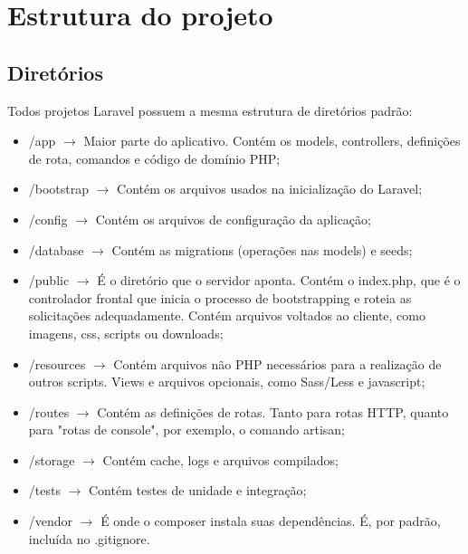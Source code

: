 \documentclass[
12pt,				%
openany,			%
twoside,			%
a4paper,			%
english,			%
french,				%
spanish,			%
brazil,				%
]{abntex2}
\begin{document}
\section{Estrutura do projeto}

\subsection{Diretórios}
Todos projetos Laravel possuem a mesma estrutura de diretórios padrão:

\begin{itemize}
    \item /app $\rightarrow$ Maior parte do aplicativo. Contém os models, controllers, definições de rota, comandos e código de domínio PHP;

    \item /bootstrap $\rightarrow$ Contém os arquivos usados na inicialização do Laravel;

    \item /config $\rightarrow$ Contém os arquivos de configuração da aplicação;

    \item /database $\rightarrow$ Contém as migrations (operações nas models) e seeds;

    \item /public $\rightarrow$ É o diretório que o servidor aponta. Contém o index.php, que é o controlador frontal que inicia o processo de bootstrapping e roteia as solicitações adequadamente. Contém arquivos voltados ao cliente, como imagens, css, scripts ou downloads;
        
    \item /resources $\rightarrow$ Contém arquivos não PHP necessários para a realização de outros scripts. Views e arquivos opcionais, como Sass/Less e javascript;

    \item /routes $\rightarrow$ Contém as definições de rotas. Tanto para rotas HTTP, quanto para "rotas de console", por exemplo, o comando artisan;

    \item /storage $\rightarrow$ Contém cache, logs e arquivos compilados;

    \item /tests $\rightarrow$ Contém testes de unidade e integração;

    \item /vendor $\rightarrow$ É onde o composer instala suas dependências. É, por padrão, incluída no .gitignore.
\end{itemize}
\end{document}

